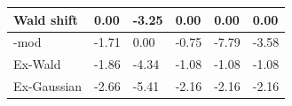 \begin{tabular}{|l|l|l|l|l|l|}
\hline
Wald shift&0.00&-3.25&0.00&0.00&0.00\\\hline
\rocdd{}-mod&-1.71&0.00&-0.75&-7.79&-3.58\\\hline
Ex-Wald&-1.86&-4.34&-1.08&-1.08&-1.08\\\hline
Ex-Gaussian&-2.66&-5.41&-2.16&-2.16&-2.16\\\hline
\end{tabular}
